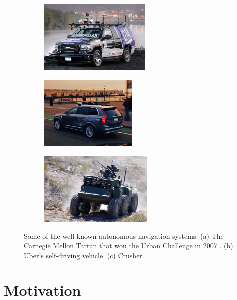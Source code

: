 \documentclass[../thesis.tex]{subfiles}
\begin{document}
\begin{figure}
    \centering
    \begin{subfigure}[b]{0.32\linewidth}
        \includegraphics[height=3.5cm]{./Introduction/fig/urban_challenge.jpg}
    \end{subfigure}
    \begin{subfigure}[b]{0.32\linewidth}
        \includegraphics[height=3.5cm]{./Introduction/fig/uber.jpg}
    \end{subfigure}
    \begin{subfigure}[b]{0.32\linewidth}
        \includegraphics[height=3.5cm]{./Introduction/fig/crusher.jpg}
    \end{subfigure}
    \caption{Some of the well-known autonomous navigation systems: (a) The Carnegie Mellon Tartan that won the Urban Challenge in 2007 \cite{boss}. (b) Uber's self-driving vehicle. (c) Crusher. \cite{stentz2007crusher}}
    \label{fig:uber_rock}
\end{figure}

\section{Motivation}

\end{document}
